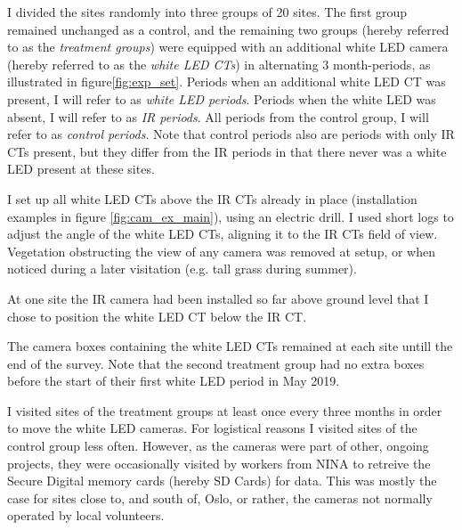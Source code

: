 I divided the sites randomly into three groups of 20 sites.
The first group remained unchanged as a control, and the remaining two groups (hereby referred to as the \emph{treatment groups}) were equipped with an additional white LED camera (hereby referred to as the \emph{white LED CTs}) in alternating 3 month-periods, as illustrated in figure\vref{fig:exp_set}.
Periods when an additional white LED CT was present, I will refer to as \emph{white LED periods}.
Periods when the white LED was absent, I will refer to as \emph{IR periods}.
All periods from the control group, I will refer to as \emph{control periods}.
Note that control periods also are periods with only IR CTs present, but they differ from the IR periods in that there never was a white LED present at these sites.


I set up all white LED CTs above the IR CTs already in place (installation examples in figure \ref{fig:cam_ex_main}), using an electric drill. 
I used short logs to adjust the angle of the white LED CTs, aligning it to the IR CTs field of view.
Vegetation obstructing the view of any camera was removed at setup, or when noticed during a later visitation (e.g. tall grass during summer).

 
At one site the IR camera had been installed so far above ground level that I chose to position the white LED CT below the IR CT. %

The camera boxes containing the white LED CTs remained at each site untill the end of the survey. Note that the second treatment group had no extra boxes  before the start of their first white LED period in May 2019.   





I visited sites of the treatment groups at least once every three months in order to move the white LED cameras.
For logistical reasons I visited sites of the control group less often.
However, as the cameras were part of other, ongoing projects, they were occasionally visited by workers from NINA to retreive the Secure Digital memory cards (hereby SD Cards) for data. %
This was mostly the case for sites close to, and south of, Oslo, or rather, the cameras not normally operated by local volunteers.





